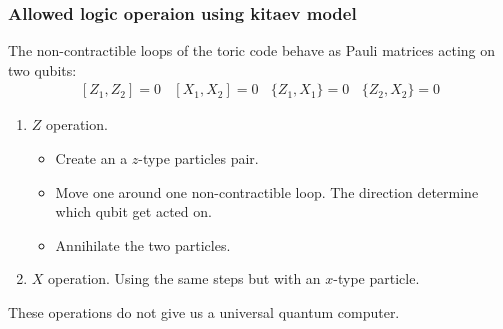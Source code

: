 \documentclass{beamer}
\renewcommand{\(}{\left(}
\renewcommand{\)}{\right)}
\renewcommand{\[}{\left[}
\renewcommand{\]}{\right]}
\begin{document}
\begin{frame}
    \frametitle{Allowed logic operaion using kitaev model}
    The non-contractible loops of the toric code behave as Pauli matrices acting on two qubits:
    \begin{align*}
        \[Z_1, Z_2 \] = 0  \ \ \ \ \[X_1, X_2 \] = 0 \ \ \ \ \{Z_1, X_1 \} = 0  \ \ \ \ \{Z_2, X_2 \} = 0 
    \end{align*}
    \begin{enumerate}
        \item $Z$ operation. 
        \begin{itemize}
            \item Create an a $z$-type particles pair. 
            \item Move one around one non-contractible loop. The direction determine which qubit get acted on. 
            \item Annihilate the two particles. 
        \end{itemize}
        \item $X$ operation. Using the same steps but with an $x$-type particle. 
    \end{enumerate}
    These operations do not give us a universal quantum computer. 
\end{frame}
\end{document}
